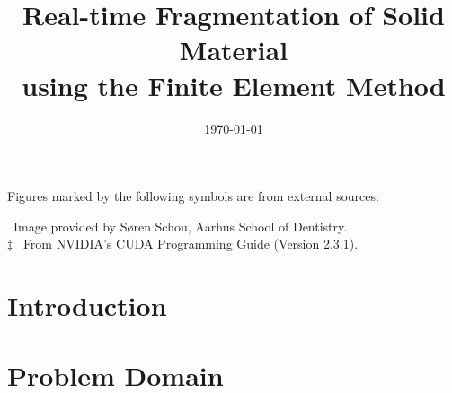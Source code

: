 \documentclass[a4paper,twoside,openright]{memoir}
\title{
  Real-time Fragmentation of Solid Material \\
  using the Finite Element Method
}
\date{\today}
\begin{document}
\pagestyle{empty}

\maketitle
\thispagestyle{empty}

%
\cleardoublepage %

\pagestyle{plain}



\thispagestyle{empty}

\cleardoublepage

\pagebreak %

\cleardoublepage
\tableofcontents*
\cleardoublepage
\listoffigures*
Figures marked by the following symbols are from external sources:
\begin{center}
\begin{minipage}{0.9\linewidth}
\textdagger \ Image provided by Søren Schou, Aarhus School of
Dentistry. \\
$\ddagger$ \ From NVIDIA's CUDA Programming Guide (Version 2.3.1).
\end{minipage}
\end{center}
\cleardoublepage
\listoftables*
\cleardoublepage
%
\pagebreak

\pagestyle{mystyle}


\chapter{Introduction}
\label{chapter:introduction}


\doubleblank

\chapter{Problem Domain}
\label{chapter:problem_domain}

\end{document}
